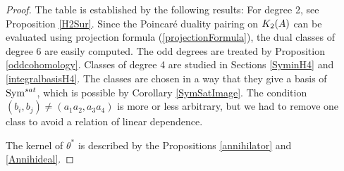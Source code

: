 \begin{proof}
The table is established by the following results:
For degree 2, see Proposition \ref{H2Sur}. Since the Poincar\'e duality pairing on $\kum{A}{2}$ can be evaluated using projection formula (\ref{projectionFormula}), the dual classes of degree 6 are easily computed.
The odd degrees are treated by Proposition \ref{oddcohomology}. Classes of degree 4 are studied in Sections \ref{SyminH4} and \ref{integralbasisH4}. The classes are chosen in a way that they give a basis of $\Sym^{sat}$, which is possible by Corollary \ref{SymSatImage}. The condition $(b_i,b_j)\neq(a_1a_2,a_3a_4)$ is more or less arbitrary, but we had to remove one class to avoid a relation of linear dependence.

The kernel of $\theta^*$ is described by the Propositions \ref{annihilator} and \ref{Annihideal}.
\end{proof}
